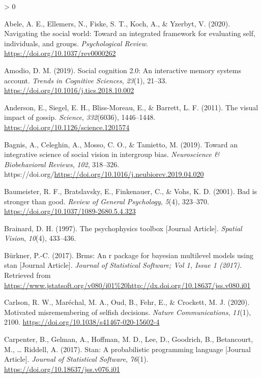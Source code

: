 \documentclass[
  english,
  man]{apa6}
\newlength{\cslhangindent}
\newenvironment{CSLReferences}[2] %
 {%
  \setlength{\parindent}{0pt}
  \ifodd #1 \everypar{\setlength{\hangindent}{\cslhangindent}}\ignorespaces\fi
  \ifnum #2 > 0
  \setlength{\parskip}{#2\baselineskip}
  \fi
 }%
 {}
\begin{document}
\hypertarget{refs}{}
\begin{CSLReferences}{1}{0}
\leavevmode\hypertarget{ref-abele_navigating_2020}{}%
Abele, A. E., Ellemers, N., Fiske, S. T., Koch, A., \& Yzerbyt, V. (2020). Navigating the social world: Toward an integrated framework for evaluating self, individuals, and groups. \emph{Psychological Review}. \url{https://doi.org/10.1037/rev0000262}

\leavevmode\hypertarget{ref-amodio_social_2019}{}%
Amodio, D. M. (2019). Social cognition 2.0: An interactive memory systems account. \emph{Trends in Cognitive Sciences}, \emph{23}(1), 21--33. \url{https://doi.org/10.1016/j.tics.2018.10.002}

\leavevmode\hypertarget{ref-anderson_visual_2011}{}%
Anderson, E., Siegel, E. H., Bliss-Moreau, E., \& Barrett, L. F. (2011). The visual impact of gossip. \emph{Science}, \emph{332}(6036), 1446--1448. \url{https://doi.org/10.1126/science.1201574}

\leavevmode\hypertarget{ref-bagnis_toward_2019}{}%
Bagnis, A., Celeghin, A., Mosso, C. O., \& Tamietto, M. (2019). Toward an integrative science of social vision in intergroup bias. \emph{Neuroscience \& Biobehavioral Reviews}, \emph{102}, 318--326. https://doi.org/\url{https://doi.org/10.1016/j.neubiorev.2019.04.020}

\leavevmode\hypertarget{ref-baumeister_bad_2001}{}%
Baumeister, R. F., Bratslavsky, E., Finkenauer, C., \& Vohs, K. D. (2001). Bad is stronger than good. \emph{Review of General Psychology}, \emph{5}(4), 323--370. \url{https://doi.org/10.1037/1089-2680.5.4.323}

\leavevmode\hypertarget{ref-Brainard_1997}{}%
Brainard, D. H. (1997). The psychophysics toolbox {[}Journal Article{]}. \emph{Spatial Vision}, \emph{10}(4), 433--436.

\leavevmode\hypertarget{ref-Buxfcrkner_2017}{}%
Bürkner, P.-C. (2017). Brms: An r package for bayesian multilevel models using stan {[}Journal Article{]}. \emph{Journal of Statistical Software; Vol 1, Issue 1 (2017)}. Retrieved from \url{https://www.jstatsoft.org/v080/i01\%20http://dx.doi.org/10.18637/jss.v080.i01}

\leavevmode\hypertarget{ref-carlson_motivated_2020}{}%
Carlson, R. W., Maréchal, M. A., Oud, B., Fehr, E., \& Crockett, M. J. (2020). Motivated misremembering of selfish decisions. \emph{Nature Communications}, \emph{11}(1), 2100. \url{https://doi.org/10.1038/s41467-020-15602-4}

\leavevmode\hypertarget{ref-Carpenter_2017_stan}{}%
Carpenter, B., Gelman, A., Hoffman, M. D., Lee, D., Goodrich, B., Betancourt, M., \ldots{} Riddell, A. (2017). Stan: A probabilistic programming language {[}Journal Article{]}. \emph{Journal of Statistical Software}, \emph{76}(1). \url{https://doi.org/10.18637/jss.v076.i01}


\end{CSLReferences}
\end{document}
